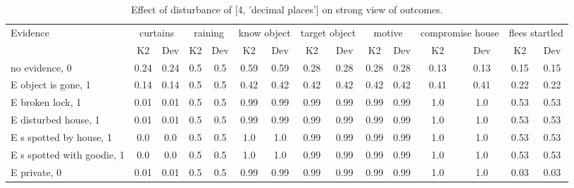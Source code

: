 \begin{table}\begin{tabular}{l|cc|cc|cc|cc|cc|cc|cc}\toprule\multirow{2}{*}{Evidence} & \multicolumn{2}{c}{curtains}& \multicolumn{2}{c}{raining}& \multicolumn{2}{c}{know object}& \multicolumn{2}{c}{target object}& \multicolumn{2}{c}{motive}& \multicolumn{2}{c}{compromise house}& \multicolumn{2}{c}{flees startled}\\& {K2} & {Dev}& {K2} & {Dev}& {K2} & {Dev}& {K2} & {Dev}& {K2} & {Dev}& {K2} & {Dev}& {K2} & {Dev}\\\midrule
no evidence, 0 & 0.24&0.24&0.5&0.5&0.59&0.59&0.28&0.28&0.28&0.28&0.13&0.13&0.15&0.15\\E object is gone, 1 & 0.14&0.14&0.5&0.5&0.42&0.42&0.42&0.42&0.42&0.42&0.41&0.41&0.22&0.22\\E broken lock, 1 & 0.01&0.01&0.5&0.5&0.99&0.99&0.99&0.99&0.99&0.99&1.0&1.0&0.53&0.53\\E disturbed house, 1 & 0.01&0.01&0.5&0.5&0.99&0.99&0.99&0.99&0.99&0.99&1.0&1.0&0.53&0.53\\E s spotted by house, 1 & 0.0&0.0&0.5&0.5&1.0&1.0&0.99&0.99&0.99&0.99&1.0&1.0&0.53&0.53\\E s spotted with goodie, 1 & 0.0&0.0&0.5&0.5&1.0&1.0&0.99&0.99&0.99&0.99&1.0&1.0&0.53&0.53\\E private, 0 & 0.01&0.01&0.5&0.5&0.99&0.99&0.99&0.99&0.99&0.99&1.0&1.0&0.03&0.03\\\bottomrule\end{tabular}\caption{Effect of disturbance of [4, 'decimal places'] on strong view of outcomes.}\end{table}